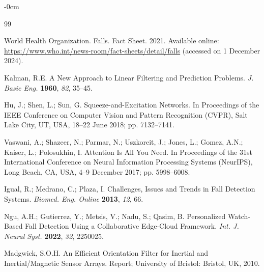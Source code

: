 \documentclass[journal,article,submit,pdftex,moreauthors]{Definitions/mdpi}
\begin{document}

\appendix



\begin{adjustwidth}{-\extralength}{0cm}
\printendnotes[custom]


\begin{thebibliography}{99}

World Health Organization. Falls. Fact Sheet. 2021. Available online: \url{https://www.who.int/news-room/fact-sheets/detail/falls} (accessed on 1 December 2024).

Kalman, R.E. A New Approach to Linear Filtering and Prediction Problems. \textit{J. Basic Eng.} \textbf{1960}, \textit{82}, 35--45.

Hu, J.; Shen, L.; Sun, G. Squeeze-and-Excitation Networks. In Proceedings of the IEEE Conference on Computer Vision and Pattern Recognition (CVPR), Salt Lake City, UT, USA, 18--22 June 2018; pp. 7132--7141.

Vaswani, A.; Shazeer, N.; Parmar, N.; Uszkoreit, J.; Jones, L.; Gomez, A.N.; Kaiser, L.; Polosukhin, I. Attention Is All You Need. In Proceedings of the 31st International Conference on Neural Information Processing Systems (NeurIPS), Long Beach, CA, USA, 4--9 December 2017; pp. 5998--6008.

Igual, R.; Medrano, C.; Plaza, I. Challenges, Issues and Trends in Fall Detection Systems. \textit{Biomed. Eng. Online} \textbf{2013}, \textit{12}, 66.

Ngu, A.H.; Gutierrez, Y.; Metsis, V.; Nadu, S.; Qasim, B. Personalized Watch-Based Fall Detection Using a Collaborative Edge-Cloud Framework. \textit{Int. J. Neural Syst.} \textbf{2022}, \textit{32}, 2250025.

Madgwick, S.O.H. An Efficient Orientation Filter for Inertial and Inertial/Magnetic Sensor Arrays. Report; University of Bristol: Bristol, UK, 2010.


\end{thebibliography}
\end{adjustwidth}
\end{document}
